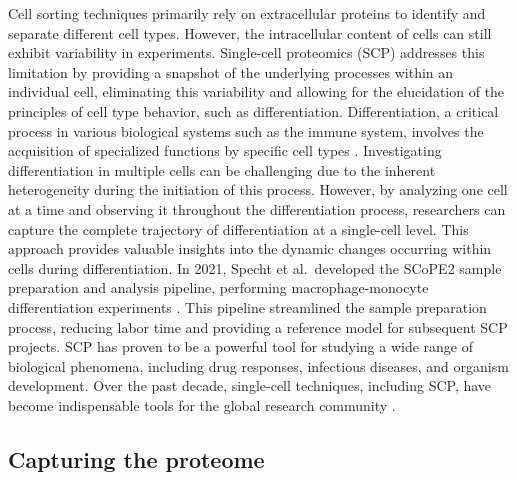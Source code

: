 \documentclass[
  11pt,
]{article}
\begin{document}
Cell sorting techniques primarily rely on extracellular proteins to identify and separate different cell types. However, the intracellular content of cells can still exhibit variability in experiments. Single-cell proteomics (SCP) addresses this limitation by providing a snapshot of the underlying processes within an individual cell, eliminating this variability and allowing for the elucidation of the principles of cell type behavior, such as differentiation.
Differentiation, a critical process in various biological systems such as the immune system, involves the acquisition of specialized functions by specific cell types \citep{Fang2018}. Investigating differentiation in multiple cells can be challenging due to the inherent heterogeneity during the initiation of this process. However, by analyzing one cell at a time and observing it throughout the differentiation process, researchers can capture the complete trajectory of differentiation at a single-cell level. This approach provides valuable insights into the dynamic changes occurring within cells during differentiation.
In 2021, Specht et al.~developed the SCoPE2 sample preparation and analysis pipeline, performing macrophage-monocyte differentiation experiments \citep{Specht2021}. This pipeline streamlined the sample preparation process, reducing labor time and providing a reference model for subsequent SCP projects. SCP has proven to be a powerful tool for studying a wide range of biological phenomena, including drug responses, infectious diseases, and organism development. Over the past decade, single-cell techniques, including SCP, have become indispensable tools for the global research community \citep{Minakshi2019}.

\hypertarget{capturing-the-proteome}{%
\subsection{Capturing the proteome}\label{capturing-the-proteome}}
\end{document}
